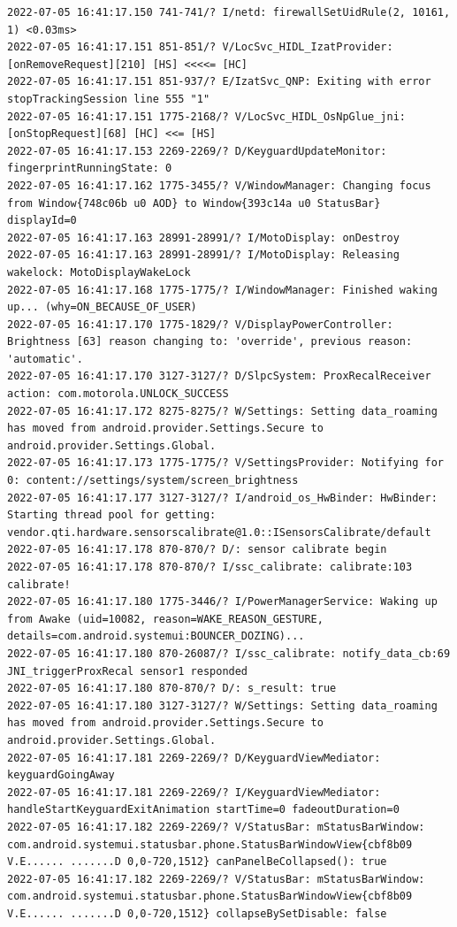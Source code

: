\documentclass[a4paper,12pt]{book}
\begin{document}
\begin{lstlisting}
2022-07-05 16:41:17.150 741-741/? I/netd: firewallSetUidRule(2, 10161, 1) <0.03ms>
2022-07-05 16:41:17.151 851-851/? V/LocSvc_HIDL_IzatProvider: [onRemoveRequest][210] [HS] <<<<= [HC]
2022-07-05 16:41:17.151 851-937/? E/IzatSvc_QNP: Exiting with error stopTrackingSession line 555 "1"
2022-07-05 16:41:17.151 1775-2168/? V/LocSvc_HIDL_OsNpGlue_jni: [onStopRequest][68] [HC] <<= [HS]
2022-07-05 16:41:17.153 2269-2269/? D/KeyguardUpdateMonitor: fingerprintRunningState: 0
2022-07-05 16:41:17.162 1775-3455/? V/WindowManager: Changing focus from Window{748c06b u0 AOD} to Window{393c14a u0 StatusBar} displayId=0
2022-07-05 16:41:17.163 28991-28991/? I/MotoDisplay: onDestroy
2022-07-05 16:41:17.163 28991-28991/? I/MotoDisplay: Releasing wakelock: MotoDisplayWakeLock
2022-07-05 16:41:17.168 1775-1775/? I/WindowManager: Finished waking up... (why=ON_BECAUSE_OF_USER)
2022-07-05 16:41:17.170 1775-1829/? V/DisplayPowerController: Brightness [63] reason changing to: 'override', previous reason: 'automatic'.
2022-07-05 16:41:17.170 3127-3127/? D/SlpcSystem: ProxRecalReceiver action: com.motorola.UNLOCK_SUCCESS
2022-07-05 16:41:17.172 8275-8275/? W/Settings: Setting data_roaming has moved from android.provider.Settings.Secure to android.provider.Settings.Global.
2022-07-05 16:41:17.173 1775-1775/? V/SettingsProvider: Notifying for 0: content://settings/system/screen_brightness
2022-07-05 16:41:17.177 3127-3127/? I/android_os_HwBinder: HwBinder: Starting thread pool for getting: vendor.qti.hardware.sensorscalibrate@1.0::ISensorsCalibrate/default
2022-07-05 16:41:17.178 870-870/? D/: sensor calibrate begin
2022-07-05 16:41:17.178 870-870/? I/ssc_calibrate: calibrate:103 calibrate!
2022-07-05 16:41:17.180 1775-3446/? I/PowerManagerService: Waking up from Awake (uid=10082, reason=WAKE_REASON_GESTURE, details=com.android.systemui:BOUNCER_DOZING)...
2022-07-05 16:41:17.180 870-26087/? I/ssc_calibrate: notify_data_cb:69 JNI_triggerProxRecal sensor1 responded
2022-07-05 16:41:17.180 870-870/? D/: s_result: true
2022-07-05 16:41:17.180 3127-3127/? W/Settings: Setting data_roaming has moved from android.provider.Settings.Secure to android.provider.Settings.Global.
2022-07-05 16:41:17.181 2269-2269/? D/KeyguardViewMediator: keyguardGoingAway
2022-07-05 16:41:17.181 2269-2269/? I/KeyguardViewMediator: handleStartKeyguardExitAnimation startTime=0 fadeoutDuration=0
2022-07-05 16:41:17.182 2269-2269/? V/StatusBar: mStatusBarWindow: com.android.systemui.statusbar.phone.StatusBarWindowView{cbf8b09 V.E...... .......D 0,0-720,1512} canPanelBeCollapsed(): true
2022-07-05 16:41:17.182 2269-2269/? V/StatusBar: mStatusBarWindow: com.android.systemui.statusbar.phone.StatusBarWindowView{cbf8b09 V.E...... .......D 0,0-720,1512} collapseBySetDisable: false

\end{lstlisting}
\end{document}
